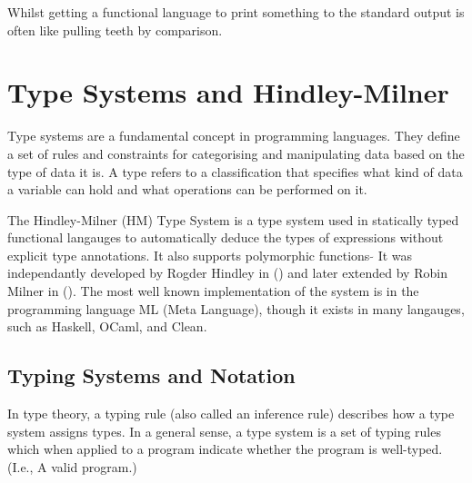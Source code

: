 \documentclass{l4proj}
\begin{document}
Whilst getting a functional language to print something to the standard output is often like pulling teeth by comparison.
\newpage
\section{Type Systems and Hindley-Milner}



Type systems are a fundamental concept in programming languages.
They define a set of rules and constraints for categorising and manipulating data based on the type of data it is.
A type refers to a classification that specifies what kind of data a variable can hold and what operations can be performed on it.


The Hindley-Milner (HM) Type System is a type system used in statically typed functional langauges to automatically deduce the types of expressions without explicit type annotations.
It also supports polymorphic functions 
$\tilde{}$ It was independantly developed by Rogder Hindley in () and later extended by Robin Milner in ().
The most well known implementation of the system is in the programming language ML (Meta Language), though it exists in many langauges, such as Haskell, OCaml, and Clean.

\subsection{Typing Systems and Notation}

In type theory, a typing rule (also called an inference rule) describes how a type system assigns types.
In a general sense, a type system is a set of typing rules which when applied to a program indicate whether the program is well-typed. (I.e., A valid program.)
\end{document}
